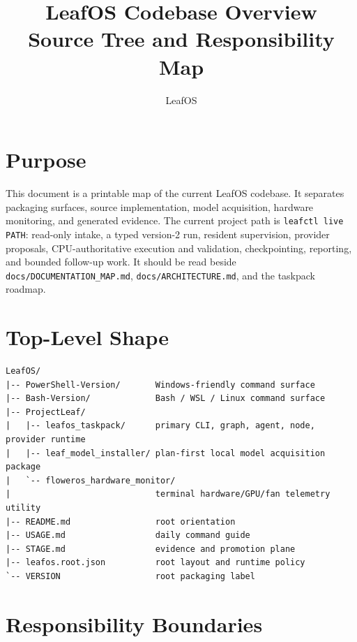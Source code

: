 \documentclass[11pt,a4paper]{article}
\title{\textbf{LeafOS Codebase Overview}\\[4pt]\large Source Tree and Responsibility Map}
\author{LeafOS}
\date{}
\begin{document}
\maketitle

\section*{Purpose}

This document is a printable map of the current LeafOS codebase. It separates
packaging surfaces, source implementation, model acquisition, hardware
monitoring, and generated evidence. The current project path is
\texttt{leafctl live PATH}: read-only intake, a typed version-2 run, resident
supervision, provider proposals, CPU-authoritative execution and validation,
checkpointing, reporting, and bounded follow-up work. It should be read beside
\texttt{docs/DOCUMENTATION\_MAP.md}, \texttt{docs/ARCHITECTURE.md}, and the
taskpack roadmap.

\section*{Top-Level Shape}

\begin{lstlisting}[language={}]
LeafOS/
|-- PowerShell-Version/       Windows-friendly command surface
|-- Bash-Version/             Bash / WSL / Linux command surface
|-- ProjectLeaf/
|   |-- leafos_taskpack/      primary CLI, graph, agent, node, provider runtime
|   |-- leaf_model_installer/ plan-first local model acquisition package
|   `-- floweros_hardware_monitor/
|                             terminal hardware/GPU/fan telemetry utility
|-- README.md                 root orientation
|-- USAGE.md                  daily command guide
|-- STAGE.md                  evidence and promotion plane
|-- leafos.root.json          root layout and runtime policy
`-- VERSION                   root packaging label
\end{lstlisting}

\section*{Responsibility Boundaries}
\end{document}
